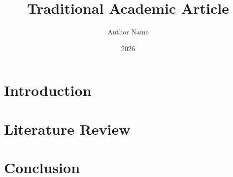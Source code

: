 \documentclass[11pt]{article}
\begin{document}
\title{Traditional Academic Article}
\author{Author Name}
\date{2026}
\maketitle

\section{Introduction}
\lipsum[1]

\section{Literature Review}
\lipsum[2]

\section{Conclusion}
\lipsum[3]
\end{document}
